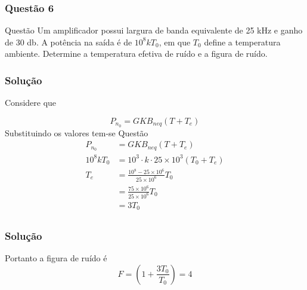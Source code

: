 \documentclass{beamer}
\begin{document}
\begin{frame}
  \frametitle{Questão 6}


  \begin{block}{Questão}
    Um amplificador possui largura de banda equivalente de 25 \si{\kilo\hertz} e ganho de 30 \si{\decibel}. A potência na saída é 
    de $10^8 k T_0$, em que $T_0$  define a temperatura ambiente. Determine a temperatura efetiva de ruído e a
    figura de ruído.
  \end{block}
  

\end{frame}








\begin{frame}
  \frametitle{Solução}

    Considere  que 

$$
P_{n_0} = GK B_{neq} (T + T_e)
$$
Substituindo os valores tem-se Questão
\begin{align*}
  P_{n_0} &= GK B_{neq} (T + T_e) \\
  10^8 k T_0&= 10^{3} \cdot k \cdot 25 \times 10^{3} (T_0 + T_e) \\
  T_e &= \frac{10^8 - 25 \times 10^{6}}{ 25 \times 10^{6}}T_0  \\
  &= \frac{75 \times 10^{6}}{ 25 \times 10^{6}}T_0  \\
  &= 3T_0  \\
\end{align*}
\end{frame}

\begin{frame}
  \frametitle{Solução}

  Portanto a figura de ruído é
$$
F = \left(1 + \frac{3T_0}{T_0}\right) = 4
$$ 

\end{frame}
\end{document}
